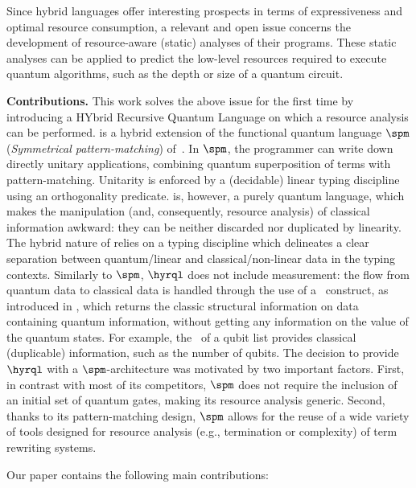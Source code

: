 Since hybrid languages offer interesting prospects in terms of expressiveness
and optimal resource consumption, a relevant and open issue concerns the
development of resource-aware (static) analyses of their programs. These static
analyses can be applied to predict the low-level resources required to execute
quantum algorithms, such as the depth or size of a quantum circuit.

\medskip
\noindent
\textbf{Contributions. }
This work solves the above issue for the first time by introducing a HYbrid
Recursive Quantum Language \hyrql{} on which a resource analysis can be
performed. \hyrql{} is a hybrid extension of the functional quantum language
$\spm$ (\emph{Symmetrical pattern-matching}) of~\cite{SVV18,Lem24}. In $\spm$,
the programmer can write down directly unitary applications, combining quantum
superposition of terms with pattern-matching. Unitarity is enforced by a
(decidable) linear typing discipline using an orthogonality predicate. \spm{}
is, however, a purely quantum language, which makes the manipulation (and,
consequently, resource analysis) of classical information awkward: they can be
neither discarded nor duplicated by linearity. The hybrid nature of \hyrql{}
relies on a typing discipline which delineates a clear separation between
quantum/linear and classical/non-linear data in the typing contexts. Similarly
to $\spm$, $\hyrql$ does not include measurement: the flow from quantum data to
classical data is handled through the use of a \textshape\ construct,  as
introduced in \cite{GLRSV13}, which returns the classic structural information
on data containing quantum information, without getting any information on the
value of the quantum states. For example, the  \textshape\ of a qubit list
provides classical (duplicable) information, such as the number of qubits. The
decision to provide $\hyrql$ with a $\spm$-architecture was motivated by two
important factors. First, in contrast with most of its competitors, $\spm$ does
not require the inclusion of an initial set of quantum gates, making its
resource analysis generic. Second, thanks to its pattern-matching design, $\spm
$ allows for the reuse of a wide variety of tools designed for resource
analysis (e.g., termination or complexity) of term rewriting systems.

Our paper contains the following main contributions:

